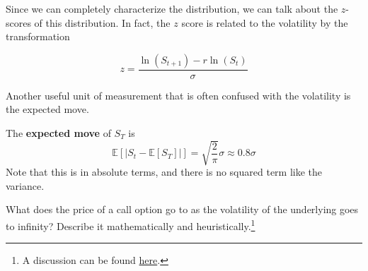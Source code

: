 \documentclass{article}
\begin{document}
    Since we can completely characterize the distribution, we can talk about the $z$-scores of this distribution. In fact, the $z$ score is related to the volatility by the transformation 

    \begin{equation}
      z = \frac{\ln(S_{t + 1}) - r \ln(S_t)}{\sigma}
    \end{equation}

    Another useful unit of measurement that is often confused with the volatility is the expected move. 

    \begin{definition}
      The \textbf{expected move} of $S_T$ is 
      \begin{equation}
        \mathbb{E}[|S_t - \mathbb{E}[S_T]|] = \sqrt{\frac{2}{\pi}} \sigma \approx 0.8 \sigma
      \end{equation}
      Note that this is in absolute terms, and there is no squared term like the variance. 
    \end{definition}

    \begin{exercise}
      What does the price of a call option go to as the volatility of the underlying goes to infinity? Describe it mathematically and heuristically.\footnote{A discussion can be found \href{https://quant.stackexchange.com/questions/39490/value-of-call-option-as-volatility-goes-to-infinity}{here}. } 
    \end{exercise}
\end{document}
